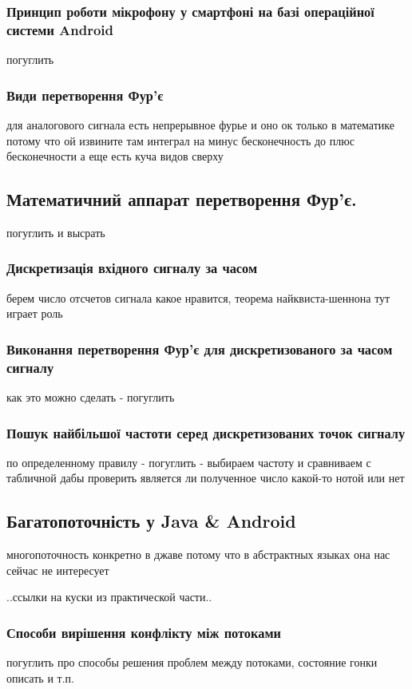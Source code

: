 \subsubsection{Принцип роботи мікрофону у смартфоні на базі операційної системи Android}

погуглить

\subsubsection{Види перетворення Фур'є}

для аналогового сигнала есть непрерывное фурье и оно ок только в математике потому что ой извините там интеграл на минус бесконечность до плюс бесконечности
а еще есть куча видов сверху

\subsection{Математичний аппарат перетворення Фур'є.}

погуглить и высрать

\subsubsection{Дискретизація вхідного сигналу за часом}

берем число отсчетов сигнала какое нравится, теорема найквиста-шеннона тут играет роль

\subsubsection{Виконання перетворення Фур'є для дискретизованого за часом сигналу}

как это можно сделать - погуглить

\subsubsection{Пошук найбільшої частоти серед дискретизованих точок сигналу}

по определенному правилу - погуглить - выбираем частоту и сравниваем с табличной дабы проверить является ли полученное число какой-то нотой или нет

\subsection{Багатопоточність у Java \& Android}

многопоточность конкретно в джаве потому что в абстрактных языках она нас сейчас не интересует

..ссылки на куски из практической части..

\subsubsection{Способи вирішення конфлікту між потоками}

погуглить про способы решения проблем между потоками, состояние гонки описать и т.п.




